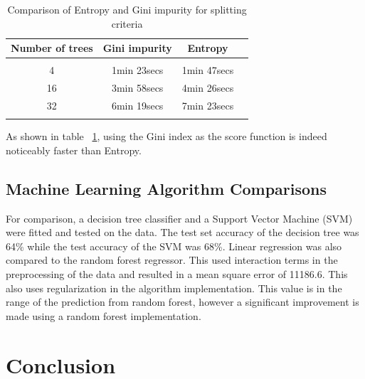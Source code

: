 \documentclass{article} %
\begin{document}
\begin{table}[h]
\caption{Comparison of Entropy and Gini impurity for splitting criteria}
\begin{center}
\begin{tabular}{cccc}
{\bf Number of trees} &{\bf Gini impurity} &{\bf Entropy}
\\ \hline \\
4	&1min 23secs    &1min 47secs\\
16	&3min 58secs    &4min 26secs\\
32	&6min 19secs    &7min 23secs\\
\label{ent-gini}
\end{tabular}
\end{center}
\end{table}

As shown in table ~\ref{ent-gini}, using the Gini index as the score function is indeed noticeably faster than Entropy.


\subsection{Machine Learning Algorithm Comparisons}

For comparison, a decision tree classifier and a Support Vector Machine (SVM) were fitted and tested on the data.
 The test set accuracy of the decision tree was 64\% while the test accuracy of the SVM was 68\%.
 Linear regression was also compared to the random forest regressor.
 This used interaction terms in the preprocessing of the data and resulted in a mean square error of 11186.6. 
This also uses regularization in the algorithm implementation.
 This value is in the range of the prediction from random forest, however a significant improvement is made using a random forest implementation.

\section{Conclusion}
\end{document}
